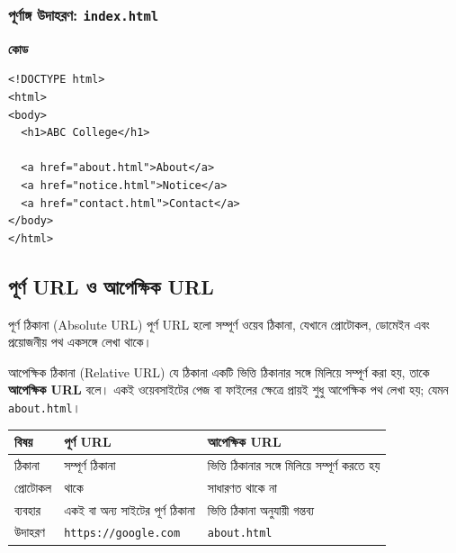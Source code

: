 \subsubsection{পূর্ণাঙ্গ উদাহরণ: \texttt{index.html}}

\par\noindent
\begin{minipage}[t]{.50\linewidth}\vspace{0pt}\small
\textbf{\color{chFourTeal}কোড}\par
\begin{verbatim}
<!DOCTYPE html>
<html>
<body>
  <h1>ABC College</h1>

  <a href="about.html">About</a>
  <a href="notice.html">Notice</a>
  <a href="contact.html">Contact</a>
</body>
</html>
\end{verbatim}

\par\smallskip
\end{minipage}\hfill
\begin{minipage}[t]{.46\linewidth}\vspace{0pt}\small

\end{minipage}\par




\subsection{পূর্ণ URL ও আপেক্ষিক URL}

\begin{definitionbox}{পূর্ণ ঠিকানা (Absolute URL)}
পূর্ণ URL হলো সম্পূর্ণ ওয়েব ঠিকানা, যেখানে প্রোটোকল, ডোমেইন এবং প্রয়োজনীয় পথ একসঙ্গে লেখা থাকে।
\end{definitionbox}

\begin{definitionbox}{আপেক্ষিক ঠিকানা (Relative URL)}
যে ঠিকানা একটি ভিত্তি ঠিকানার সঙ্গে মিলিয়ে সম্পূর্ণ করা হয়, তাকে \textbf{আপেক্ষিক URL} বলে। একই ওয়েবসাইটের পেজ বা ফাইলের ক্ষেত্রে প্রায়ই শুধু আপেক্ষিক পথ লেখা হয়; যেমন \texttt{about.html}।
\end{definitionbox}

\begin{center}
\begin{tabular}{|p{}|p{}|p{}|}
\hline
\textbf{বিষয়} & \textbf{পূর্ণ URL} & \textbf{আপেক্ষিক URL} \\
\hline
ঠিকানা & সম্পূর্ণ ঠিকানা & ভিত্তি ঠিকানার সঙ্গে মিলিয়ে সম্পূর্ণ করতে হয় \\
\hline
প্রোটোকল & থাকে & সাধারণত থাকে না \\
\hline
ব্যবহার & একই বা অন্য সাইটের পূর্ণ ঠিকানা & ভিত্তি ঠিকানা অনুযায়ী গন্তব্য \\
\hline
উদাহরণ & \texttt{https://google.com} & \texttt{about.html} \\
\hline
\end{tabular}
\end{center}

